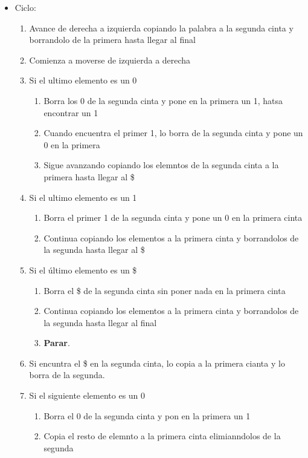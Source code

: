 \begin{itemize}
    \item Ciclo:
    \begin{enumerate}[1.]
        \item Avance de derecha a izquierda copiando la palabra a la segunda cinta y borrandolo de la primera hasta llegar al final
        \item Comienza a moverse de izquierda a derecha
        \item Si el ultimo elemento es un 0
        \begin{enumerate}[1.]
            \item Borra los 0 de la segunda cinta y pone en la primera un 1, hatsa encontrar un 1
            \item Cuando encuentra el primer 1, lo borra de la segunda cinta y pone un 0 en la primera
            \item Sigue avanzando copiando los elemntos de la segunda cinta a la primera hasta llegar al \$
        \end{enumerate}
        \item Si el ultimo elemento es un 1   
        \begin{enumerate}[1.]
            \item Borra el primer 1 de la segunda cinta y pone un 0 en la primera cinta
            \item Continua copiando los elementos a la primera cinta y borrandolos de la segunda hasta llegar al \$
        \end{enumerate} 
        \item Si el último elemento es un \$
        \begin{enumerate}[1.]
            \item Borra el \$ de la segunda cinta sin poner nada en la primera cinta
            \item Continua copiando los elementos a la primera cinta y borrandolos de la segunda hasta llegar al final
            \item \textbf{Parar}.
        \end{enumerate} 
        \item Si encuntra el \$ en la segunda cinta, lo copia a la primera cianta y lo borra de la segunda.
        \item Si el siguiente elemento es un 0
        \begin{enumerate}[1.]
            \item Borra el 0 de la segunda cinta y pon en la primera un 1
            \item Copia el resto de elemnto a la primera cinta elimianndolos de la segunda

\end{enumerate}
\end{enumerate}
\end{itemize}
